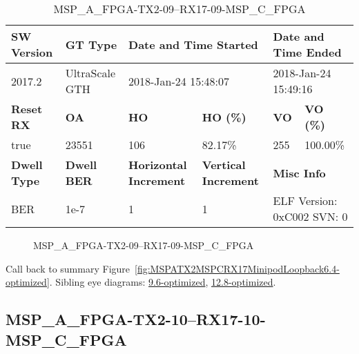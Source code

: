 \begin{table}[h]
\centering
\caption{MSP\_A\_FPGA-TX2-09--RX17-09-MSP\_C\_FPGA}
\label{tab:MSPAFPGATX209RX1709MSPCFPGA6.4-optimized}
\begin{tabular}{@{}|l|l|l|l|l|l|@{}}
\toprule
\textbf{SW Version}                & \textbf{GT Type}   & \multicolumn{2}{l|}{\textbf{Date and Time Started}}            & \multicolumn{2}{l|}{\textbf{Date and Time Ended}}        \\ \midrule
2017.2                       & UltraScale GTH          & \multicolumn{2}{l|}{2018-Jan-24 15:48:07}                   & \multicolumn{2}{l|}{2018-Jan-24 15:49:16}               \\ \midrule
\textbf{Reset RX}                  & \textbf{OA} & \textbf{HO}   & \textbf{HO (\%)} & \textbf{VO} & \textbf{VO (\%)} \\ \midrule
true & 23551        & 106          & 82.17\%        & 255        & 100.00\%       \\ \midrule
\textbf{Dwell Type}                & \textbf{Dwell BER} & \textbf{Horizontal Increment} & \textbf{Vertical Increment}    & \multicolumn{2}{l|}{\textbf{Misc Info}}                  \\ \midrule
BER                            & 1e-7        & 1        & 1           & \multicolumn{2}{l|}{ELF Version: 0xC002 SVN: 0}                         \\ \bottomrule
\end{tabular}
\end{table}

\begin{figure}[h]
\caption{MSP\_A\_FPGA-TX2-09--RX17-09-MSP\_C\_FPGA} \label{fig:MSPAFPGATX209RX1709MSPCFPGA6.4-optimized}
\end{figure}

Call back to summary Figure~\ref{fig:MSPATX2MSPCRX17MinipodLoopback6.4-optimized}.
Sibling eye diagrams: \hyperref[sec:MSPAFPGATX209RX1709MSPCFPGA9.6-optimized]{9.6-optimized}, \hyperref[sec:MSPAFPGATX209RX1709MSPCFPGA12.8-optimized]{12.8-optimized}.

\clearpage
\newpage


\subsection{MSP\_A\_FPGA-TX2-10--RX17-10-MSP\_C\_FPGA}\label{sec:MSPAFPGATX210RX1710MSPCFPGA6.4-optimized}

